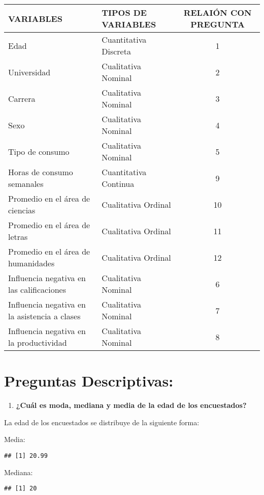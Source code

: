 \documentclass[]{article}
\newenvironment{Shaded}{\begin{snugshade}}{\end{snugshade}}
\newcommand{\KeywordTok}[1]{\textcolor[rgb]{0.13,0.29,0.53}{\textbf{#1}}}
\newcommand{\DecValTok}[1]{\textcolor[rgb]{0.00,0.00,0.81}{#1}}
\newcommand{\OperatorTok}[1]{\textcolor[rgb]{0.81,0.36,0.00}{\textbf{#1}}}
\newcommand{\NormalTok}[1]{#1}
\providecommand{\tightlist}{%
  \setlength{\itemsep}{0pt}\setlength{\parskip}{0pt}}
\begin{document}
\begin{longtable}[]{@{}llc@{}}
\toprule
VARIABLES & TIPOS DE VARIABLES & RELAIÓN CON PREGUNTA\tabularnewline
\midrule
\endhead
Edad & Cuantitativa Discreta & 1\tabularnewline
Universidad & Cualitativa Nominal & 2\tabularnewline
Carrera & Cualitativa Nominal & 3\tabularnewline
Sexo & Cualitativa Nominal & 4\tabularnewline
Tipo de consumo & Cualitativa Nominal & 5\tabularnewline
Horas de consumo semanales & Cuantitativa Continua & 9\tabularnewline
Promedio en el área de ciencias & Cualitativa Ordinal &
10\tabularnewline
Promedio en el área de letras & Cualitativa Ordinal & 11\tabularnewline
Promedio en el área de humanidades & Cualitativa Ordinal &
12\tabularnewline
Influencia negativa en las calificaciones & Cualitativa Nominal &
6\tabularnewline
Influencia negativa en la asistencia a clases & Cualitativa Nominal &
7\tabularnewline
Influencia negativa en la productividad & Cualitativa Nominal &
8\tabularnewline
\bottomrule
\end{longtable}

\section{Preguntas Descriptivas:}\label{preguntas-descriptivas}

\begin{enumerate}
\def\labelenumi{\arabic{enumi}.}
\tightlist
\item
  \textbf{¿Cuál es moda, mediana y media de la edad de los encuestados?}
\end{enumerate}

La edad de los encuestados se distribuye de la siguiente forma:

Media:

\begin{verbatim}
## [1] 20.99
\end{verbatim}

Mediana:

\begin{Shaded}
\end{Shaded}

\begin{verbatim}
## [1] 20
\end{verbatim}
\end{document}

